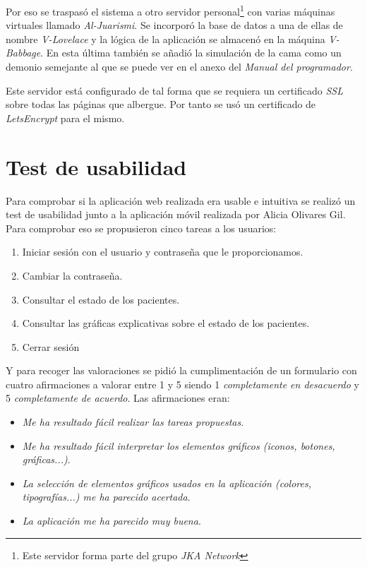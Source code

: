 Por eso se traspasó el sistema a otro servidor personal\footnote{Este servidor forma parte del grupo \textit{JKA Network}} con varias máquinas virtuales llamado \textit{Al-Juarismi}. Se incorporó la base de datos a una de ellas de nombre \textit{V-Lovelace} y la lógica de la aplicación se almacenó en la máquina \textit{V-Babbage}. En esta última también se añadió la simulación de la cama como un demonio semejante al que se puede ver en el anexo del \textit{Manual del programador}. %

Este servidor está configurado de tal forma que se requiera un certificado \textit{SSL} sobre todas las páginas que albergue. Por tanto se usó un certificado de \textit{LetsEncrypt} para el mismo.

\section{Test de usabilidad}

Para comprobar si la aplicación web realizada era usable e intuitiva se realizó un test de usabilidad junto a la aplicación móvil realizada por Alicia Olivares Gil. Para comprobar eso se propusieron cinco tareas a los usuarios:

\begin{enumerate}\small
	\item Iniciar sesión con el usuario y contraseña que le proporcionamos. 
	\item Cambiar la contraseña. 
	\item Consultar el estado de los pacientes. 
	\item Consultar las gráficas explicativas sobre el estado de los pacientes. 
	\item Cerrar sesión	
\end{enumerate}

Y para recoger las valoraciones se pidió la cumplimentación de un formulario con cuatro afirmaciones a valorar entre 1 y 5 siendo 1 \textit{completamente en desacuerdo} y 5 \textit{completamente de acuerdo}. Las afirmaciones eran:
\begin{itemize}\small
	\item \textit{Me ha resultado fácil realizar las tareas propuestas}.
	\item \textit{Me ha resultado fácil interpretar los elementos gráficos (iconos, botones, gráficas...)}.
	\item \textit{La selección de elementos gráficos usados en la aplicación (colores, tipografías...) me ha parecido acertada}.
	\item \textit{La aplicación me ha parecido muy buena}.
\end{itemize}

